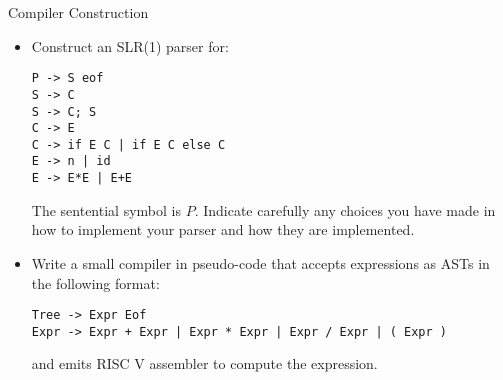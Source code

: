 \documentclass{tripos}  %
\begin{document}
\begin{question}[MockIB,year=2024,paper=1,question=9,author=rrw]{Compiler Construction}



\begin{itemize}
\item Construct an SLR(1) parser for:
\begin{verbatim}
P -> S eof
S -> C
S -> C; S
C -> E
C -> if E C | if E C else C
E -> n | id
E -> E*E | E+E
\end{verbatim}

The sentential symbol is $P$. Indicate carefully any choices you have made in how to implement your parser and how they are implemented.

\item Write a small compiler in pseudo-code that accepts expressions as ASTs in the following format:

\begin{verbatim}
Tree -> Expr Eof
Expr -> Expr + Expr | Expr * Expr | Expr / Expr | ( Expr )
\end{verbatim}

and emits RISC V assembler to compute the expression. 
 \end{itemize}


\end{question}
\end{document}
